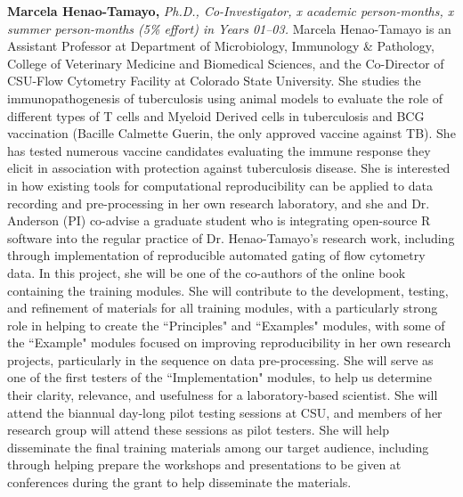 \documentclass[pdftex,english,11pt,parskip=half]{scrartcl}
\begin{document}
\noindent \textbf{Marcela Henao-Tamayo,} \textit{Ph.D., Co-Investigator, x academic person-months, x summer person-months (5\% effort) in Years 01--03.} Marcela Henao-Tamayo is an Assistant Professor at Department of Microbiology, Immunology \& Pathology, College of Veterinary Medicine and Biomedical Sciences, and the Co-Director of CSU-Flow Cytometry Facility at Colorado State University. She studies the immunopathogenesis of tuberculosis using animal models to evaluate the role of different types of T cells and Myeloid Derived cells in tuberculosis and BCG vaccination (Bacille Calmette Guerin, the only approved vaccine against TB). She has tested numerous vaccine candidates evaluating the immune response they elicit in association with protection against tuberculosis disease. She is interested in how existing tools for computational reproducibility can be applied to data recording and pre-processing in her own research laboratory, and she and Dr. Anderson (PI) co-advise a graduate student who is integrating open-source R software into the regular practice of Dr. Henao-Tamayo's research work, including through implementation of reproducible automated gating of flow cytometry data. In this project, she will be one of the co-authors of the online book containing the training modules. She will contribute to the development, testing, and refinement of materials for all training modules, with a particularly strong role in helping to create the ``Principles" and ``Examples" modules, with some of the ``Example" modules focused on improving reproducibility in her own research projects, particularly in the sequence on data pre-processing. She will serve as one of the first testers of the ``Implementation" modules, to help us determine their clarity, relevance, and usefulness for a laboratory-based scientist. She will attend the biannual day-long pilot testing sessions at CSU, and members of her research group will attend these sessions as pilot testers. She will help disseminate the final training materials among our target audience, including through helping prepare the workshops and presentations to be given at conferences during the grant to help disseminate the materials. 
\end{document}
